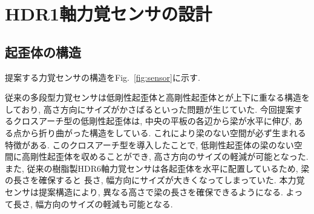 \section{HDR1軸力覚センサの設計}
\subsection{起歪体の構造}
提案する力覚センサの構造をFig.~\ref{fig:sensor}に示す. 

従来の多段型力覚センサは低剛性起歪体と高剛性起歪体とが上下に重なる構造をしており, 
高さ方向にサイズがかさばるといった問題が生じていた. 
今回提案するクロスアーチ型の低剛性起歪体は, 中央の平板の各辺から梁が水平に伸び, 
ある点から折り曲がった構造をしている. 
これにより梁のない空間が必ず生まれる特徴がある. 
このクロスアーチ型を導入したことで, 低剛性起歪体の梁のない空間に高剛性起歪体を収めることができ, 
高さ方向のサイズの軽減が可能となった. 
また, 従来の樹脂製HDR6軸力覚センサは各起歪体を水平に配置しているため, 梁の長さを確保すると
長さ, 幅方向にサイズが大きくなってしまっていた. 本力覚センサは提案構造により, 
異なる高さで梁の長さを確保できるようになる. よって長さ, 幅方向のサイズの軽減も可能となる.

